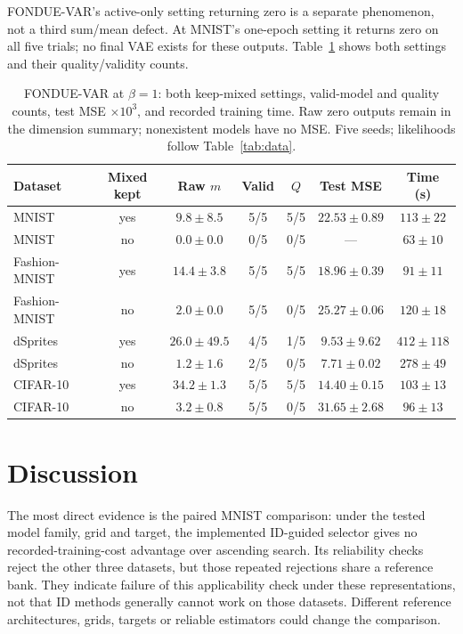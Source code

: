 \documentclass[make,article,submit,pdftex,moreauthors]{Definitions/mdpi}
\begin{document}
FONDUE-VAR's active-only setting returning zero is a separate phenomenon,
not a third sum/mean defect. At MNIST's one-epoch setting it returns zero
on all five trials; no final VAE exists for these outputs.
Table~\ref{tab:var} shows both settings and their quality/validity counts.

\begin{table}[H]
\caption{FONDUE-VAR at $\beta=1$: both keep-mixed settings, valid-model and quality counts, test MSE $\times10^3$, and recorded training time. Raw zero outputs remain in the dimension summary; nonexistent models have no MSE. Five seeds; likelihoods follow Table~\ref{tab:data}.}\label{tab:var}
\footnotesize
\setlength{\tabcolsep}{3.5pt}
\begin{tabular*}{\textwidth}{@{\extracolsep{\fill}}lcccccc@{}}
\toprule
Dataset & Mixed kept & Raw $m$ & Valid & $Q$ & Test MSE & Time (s) \\
\midrule
MNIST & yes & $9.8 \pm 8.5$ & 5/5 & 5/5 & $22.53 \pm 0.89$ & $113 \pm 22$ \\
MNIST & no & $0.0 \pm 0.0$ & 0/5 & 0/5 & --- & $63 \pm 10$ \\
Fashion-MNIST & yes & $14.4 \pm 3.8$ & 5/5 & 5/5 & $18.96 \pm 0.39$ & $91 \pm 11$ \\
Fashion-MNIST & no & $2.0 \pm 0.0$ & 5/5 & 0/5 & $25.27 \pm 0.06$ & $120 \pm 18$ \\
dSprites & yes & $26.0 \pm 49.5$ & 4/5 & 1/5 & $9.53 \pm 9.62$ & $412 \pm 118$ \\
dSprites & no & $1.2 \pm 1.6$ & 2/5 & 0/5 & $7.71 \pm 0.02$ & $278 \pm 49$ \\
CIFAR-10 & yes & $34.2 \pm 1.3$ & 5/5 & 5/5 & $14.40 \pm 0.15$ & $103 \pm 13$ \\
CIFAR-10 & no & $3.2 \pm 0.8$ & 5/5 & 0/5 & $31.65 \pm 2.68$ & $96 \pm 13$ \\
\bottomrule
\end{tabular*}
\end{table}


\section{Discussion}\label{sec:discussion}
The most direct evidence is the paired MNIST comparison: under the tested
model family, grid and target, the implemented ID-guided selector gives
no recorded-training-cost advantage over ascending search. Its reliability
checks reject the other three datasets, but those repeated rejections
share a reference bank. They indicate failure of this applicability check
under these representations, not that ID methods generally cannot work
on those datasets. Different reference architectures, grids, targets or
reliable estimators could change the comparison.
\end{document}
